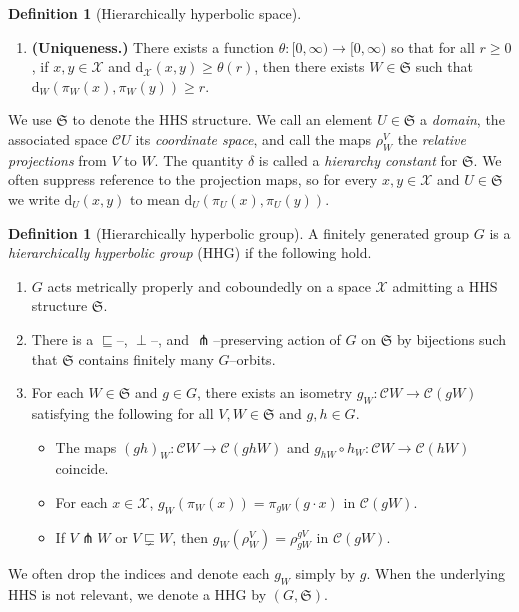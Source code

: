 \documentclass[svgnames]{amsart}
\theoremstyle{plain}
\theoremstyle{definition}
\newtheorem{defn}[thm]{Definition}
\newcommand{\cal}[1]{\mathcal{#1}}
\newcommand{\frakS}{\mathfrak{S}}
\newcommand{\dist}{\mathrm{d}}
\newcommand{\nest}{\sqsubseteq}
\newcommand{\propnest}{\sqsubsetneq}
\newcommand{\trans}{\pitchfork}
\begin{document}
\begin{defn}[Hierarchically hyperbolic space]
\begin{enumerate}[label=(\arabic*{})]
    \item\textbf{(Uniqueness.)} There exists a function $\theta \colon [0,\infty) \to [0,\infty)$ so that for all $r \geq 0$, if $x,y\in\cal X$ and $\dist_\cal{X}(x,y)\geq\theta(r)$, then there exists $W\in\frakS$ such that $\dist_W(\pi_W(x),\pi_W(y))\geq r$. \label{axiom:uniqueness}
\end{enumerate}
	
	
    We use $\frakS$ to denote the HHS structure.  We call an element $U\in \frakS$ a \emph{domain}, the associated space $\cal CU$ its \emph{coordinate space}, and call the maps $\rho_W^V$ the \emph{relative projections} from $V$ to $W$. The quantity $\delta$ is called a \emph{hierarchy constant} for $\frakS$. We often suppress reference to the projection maps, so for every $x,y\in\cal X$ and $U\in \frakS$ we write $\dist_U(x,y)$ to mean $\dist_U(\pi_U(x), \pi_U(y))$.
\end{defn}	




\begin{defn}[Hierarchically hyperbolic group]\label{defn:HHG}
A finitely generated group $G$ is a \emph{hierarchically hyperbolic group} (HHG) if the following hold.
    \begin{enumerate}[label=(\roman*{})]
        \item\label{HHG_structure} $G$ acts metrically properly and coboundedly on a space $\cal X$ admitting a HHS structure $\frakS$.
        \item\label{HHG_action} There is a $\nest$--, $\perp$--, and $\trans$--preserving action of $G$ on $\frakS$ by bijections such that $\frakS$ contains finitely many $G$--orbits.
        \item\label{HHG_isometries} For each $W\in \frakS$ and $g\in G$, there exists an isometry $g_W\colon \cal CW \to \cal C(gW)$ satisfying the following for all $V,W\in\frakS$ and $g,h\in G$.
            \begin{itemize}
                \item The maps $(gh)_W\colon \cal CW \to \cal C(ghW)$ and $g_{hW}\circ h_W\colon \cal CW\to \cal C(hW)$ coincide.
                \item For each $x\in\cal  X$, $g_W(\pi_W(x))=\pi_{gW}(g\cdot x)$ in $\cal C(gW)$.
                \item If $V\trans W$ or $V\propnest W$, then $g_W(\rho^V_W)=\rho^{gV}_{gW}$ in $\cal C(gW)$.
            \end{itemize}
    \end{enumerate}
     We often drop the indices and denote each $g_W$ simply by $g$. When the underlying HHS is not relevant, we denote a HHG by $(G,\frakS)$.
\end{defn}
\end{document}
